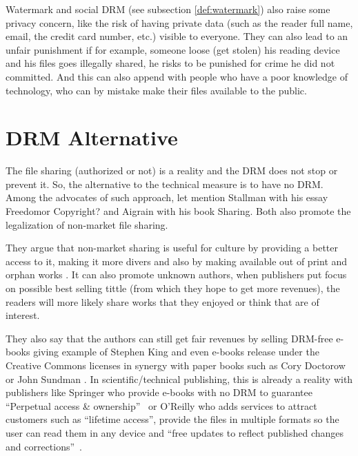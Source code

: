 \documentclass[11pt,a4paper,oneside]{memoir}
\begin{document}
Watermark and social DRM (see subsection \vref{def:watermark}) also raise some privacy concern, like the risk of having private data (such as the reader full name, email, the credit card number, etc.) visible to everyone. They can also lead to an unfair punishment if for example, someone loose (get stolen) his reading device and his files goes illegally shared, he risks to be punished for crime he did not committed. And this can also append with people who have a poor knowledge of technology, who can by mistake make their files available to the public.


\section{DRM Alternative}

The file sharing (authorized or not) is a reality and the DRM does not stop or prevent it. So, the alternative to the technical measure is to have no DRM. Among the advocates of such approach, let mention Stallman \cite{gnu:freedom_or_copyright} with his essay Freedom\textemdash or Copyright? and Aigrain \cite{aigrain:sharing} with his book Sharing. Both also promote the legalization of non-market file sharing.

They argue that non-market sharing is useful for culture \cite{gnu:freedom_or_copyright} by providing a better access to it, making it more divers and also by making available out of print and orphan works \cite[section 3.2]{aigrain:sharing}. It can also promote unknown authors, when publishers put focus on possible best selling tittle (from which they hope to get more revenues), the readers will more likely share works that they enjoyed or think that are of interest. 

They also say that the authors can still get fair revenues by selling DRM-free e-books giving example of Stephen King \cite{gnu:freedom_or_copyright} and even e-books release under the Creative Commons licenses in synergy with paper books such as Cory Doctorow or John Sundman \cite[section 7.4]{aigrain:sharing}. In scientific/technical publishing, this is already a reality with publishers like Springer who provide e-books with no DRM to guarantee \textquotedblleft Perpetual access \& ownership\textquotedblright ~\cite{springer:ebooks} or O'Reilly\label{def:alternative:oReilly} who adds services to attract customers such as \textquotedblleft lifetime access\textquotedblright , provide the files in multiple formats so the user can read them in any device and \textquotedblleft free updates to reflect published changes and corrections\textquotedblright ~\cite{oreilly:ebook}. 
\end{document}
